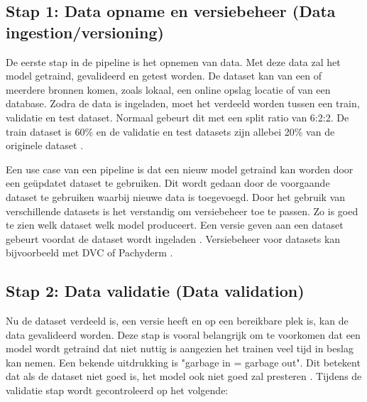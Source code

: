 \subsection{Stap 1: Data opname en versiebeheer (Data ingestion/versioning)}\label{subsec:data-opname-en-versiebeheer}
De eerste stap in de pipeline is het opnemen van data. Met deze data zal het model getraind, gevalideerd en getest worden. De dataset kan van een of meerdere bronnen komen, zoals lokaal, een online opslag locatie of van een database. Zodra de data is ingeladen, moet het verdeeld worden tussen een train, validatie en test dataset. Normaal gebeurt dit met een split ratio van 6:2:2. De train dataset is 60\% en de validatie en test datasets zijn allebei 20\% van de originele dataset \cite[p.~27-37]{building-machine-learning-pipelines-oreilly}.

Een use case van een pipeline is dat een nieuw model getraind kan worden door een geüpdatet dataset te gebruiken. Dit wordt gedaan door de voorgaande dataset te gebruiken waarbij nieuwe data is toegevoegd. Door het gebruik van verschillende datasets is het verstandig om versiebeheer toe te passen. Zo is goed te zien welk dataset welk model produceert. Een versie geven aan een dataset gebeurt voordat de dataset wordt ingeladen \cite[p.~39-40]{building-machine-learning-pipelines-oreilly}. Versiebeheer voor datasets kan bijvoorbeeld met DVC \cite{dvc} of Pachyderm \cite{pachyderm}.



\subsection{Stap 2: Data validatie (Data validation)}\label{subsec:data-validatie}
Nu de dataset verdeeld is, een versie heeft en op een bereikbare plek is, kan de data gevalideerd worden. Deze stap is vooral belangrijk om te voorkomen dat een model wordt getraind dat niet nuttig is aangezien het trainen veel tijd in beslag kan nemen. Een bekende uitdrukking is "garbage in = garbage out". Dit betekent dat als de dataset niet goed is, het model ook niet goed zal presteren \cite[p.~43]{building-machine-learning-pipelines-oreilly}. Tijdens de validatie stap wordt gecontroleerd op het volgende:

